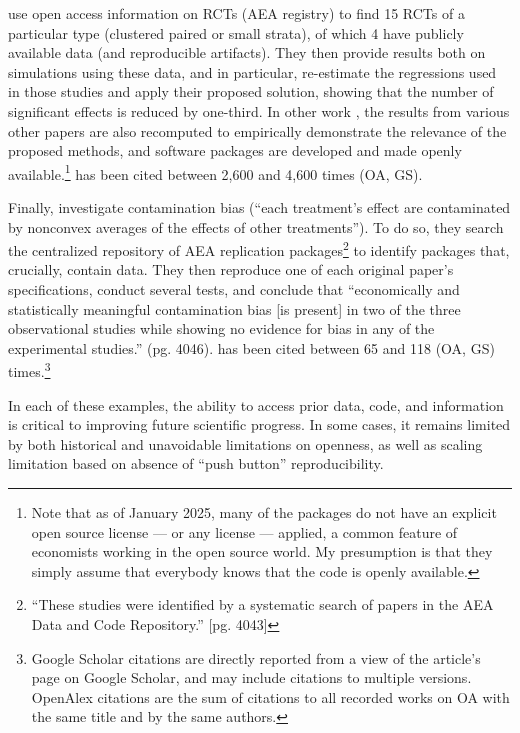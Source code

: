 \documentclass{article}
\begin{document}
\citet{de_chaisemartin_at_2024} use open access information on RCTs (AEA registry) to find 15 RCTs of a particular type (clustered paired or small strata), of which 4 have publicly available data (and reproducible artifacts). They then provide results both on simulations using these data, and in particular, re-estimate the regressions used in those studies and apply their proposed solution, showing that the number of significant effects is reduced by one-third. In other work \citep{de_chaisemartin_two-way_2020,de_chaisemartin_difference--differences_2024}, the results from various other papers are also recomputed to empirically demonstrate the relevance of the proposed methods, and software packages \citep[e.g.][]{de_chaisemartin_chaisemartinpackagesdid_multiplegt_dyn_2025} are developed and made openly available.\footnote{Note that as of January 2025, many of the packages do not have an explicit open source license --- or any license --- applied, a common feature of economists working in the open source world. My presumption is that they simply assume that everybody knows that the code is openly available.} \citet{de_chaisemartin_two-way_2020} has been cited between 2,600 and 4,600 times (OA, GS).


Finally, \citet{goldsmith-pinkham_contamination_2024} investigate contamination bias (``each treatment’s effect are contaminated by nonconvex averages of the effects of other treatments''). To do so, they search the centralized repository of AEA replication packages\footnote{``These studies were identified by a systematic search of papers in the AEA Data and Code Repository.'' [pg. 4043]} to identify  packages that, crucially, contain data. They then reproduce one of each original paper's specifications, conduct several tests, and conclude that ``economically and statistically meaningful contamination bias [is present] in two of the three observational studies while showing no evidence for bias in any of the experimental studies.'' (pg. 4046). \citet{goldsmith-pinkham_contamination_2024}  has been cited between 65 and 118 (OA, GS) times.\footnote{Google Scholar citations are directly reported from a view of the article's page on Google Scholar, and may include citations to multiple versions. OpenAlex citations are the sum of citations to all recorded works on OA with the same title and by the same authors.}

In each of these examples, the ability to access prior data, code, and information is critical to improving future scientific progress. In some cases, it remains limited by both historical and unavoidable limitations on openness, as well as scaling limitation based on absence of ``push button'' reproducibility.
\end{document}
